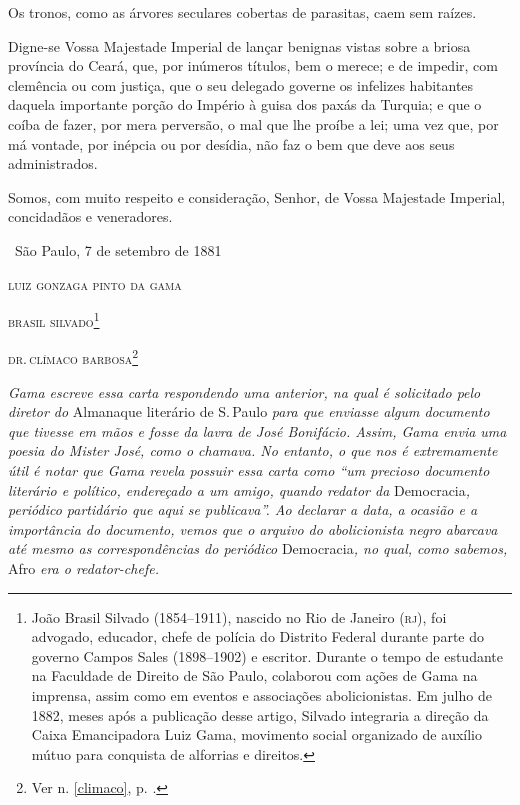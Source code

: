 Os tronos, como as árvores seculares cobertas de parasitas, caem sem
raízes.

Digne-se Vossa Majestade Imperial de lançar benignas vistas sobre a
briosa província do Ceará, que, por inúmeros títulos, bem o merece; e de
impedir, com clemência ou com justiça, que o seu delegado governe os
infelizes habitantes daquela importante porção do Império à guisa dos
paxás da Turquia; e que o coíba de fazer, por mera perversão, o mal que
lhe proíbe a lei; uma vez que, por má vontade, por inépcia ou por
desídia, não faz o bem que deve aos seus administrados.

Somos, com muito respeito e consideração, Senhor, de Vossa Majestade
Imperial, concidadãos e veneradores.\medskip

\hfill\ São Paulo, 7 de setembro de 1881

\hfill\textsc{luiz gonzaga pinto da gama}

\hfill\textsc{brasil silvado}\footnote{João Brasil Silvado (1854--1911), nascido no
  Rio de Janeiro (\textsc{rj}), foi advogado, educador, chefe de polícia do
  Distrito Federal durante parte do governo Campos Sales (1898--1902) e
  escritor. Durante o tempo de estudante na Faculdade de Direito de São
  Paulo, colaborou com ações de Gama na imprensa, assim como em eventos
  e associações abolicionistas. Em julho de 1882, meses após a
  publicação desse artigo, Silvado integraria a direção da Caixa
  Emancipadora Luiz Gama, movimento social organizado de auxílio mútuo
  para conquista de alforrias e direitos.}

\hfill\textsc{dr.\,clímaco barbosa}\footnote{Ver n. \ref{climaco}, p. \pageref{climaco}.}


\begin{resumo}
\emph{Gama escreve essa carta respondendo uma anterior, na qual é
solicitado pelo diretor do} Almanaque literário de S.\,Paulo \emph{para
que enviasse algum documento que tivesse em mãos e fosse da lavra de
José Bonifácio. Assim, Gama envia uma poesia do Mister José, como o
chamava. No entanto, o que nos é extremamente útil é notar que Gama
revela possuir essa carta como ``um precioso documento literário e
político, endereçado a um amigo, quando redator da} Democracia\emph{,
periódico partidário que aqui se publicava''. Ao declarar a data, a
ocasião e a importância do documento, vemos que o arquivo do
abolicionista negro abarcava até mesmo as correspondências do periódico}
Democracia\emph{, no qual, como sabemos,} Afro \emph{era o
redator-chefe.}
\end{resumo}

